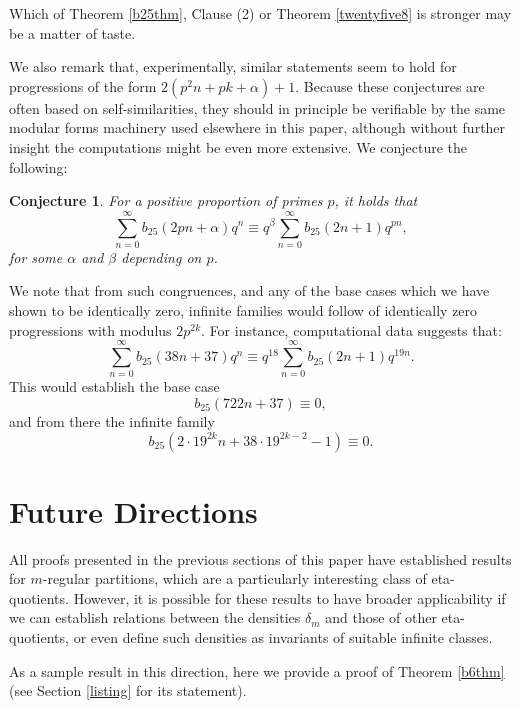 \documentclass[12pt]{amsart}
\newtheorem{conjecture}[theorem]{Conjecture}
\theoremstyle{definition}
\begin{document}
Which of Theorem \ref{b25thm}, Clause (2) or Theorem \ref{twentyfive8} is stronger may be a matter of taste.

We also remark that, experimentally, similar statements seem to hold for progressions of the form $2(p^2 n + pk + \alpha) +1$.  Because these conjectures are often based on self-similarities, they should in principle be verifiable by the same modular forms machinery used elsewhere in this paper, although without further insight the computations might be even more extensive.  We conjecture the following:
\begin{conjecture} For a positive proportion of primes $p$, it holds that $$\sum_{n=0}^\infty b_{25} (2pn+\alpha) q^n \equiv q^{\beta} \sum_{n=0}^\infty b_{25}(2n+1) q^{pn},$$ \noindent for some $\alpha$ and $\beta$ depending on $p$.
\end{conjecture}

We note that from such congruences, and any of the base cases which we have shown to be identically zero, infinite families would follow of identically zero progressions with modulus $2p^{2k}$.  For instance, computational data suggests that:
$$\sum_{n=0}^\infty b_{25}(38n+37) q^n \equiv q^{18} \sum_{n=0}^\infty b_{25} (2n+1) q^{19n}.$$
This would establish the base case
$$b_{25}(722n+37) \equiv 0,$$
and from there the infinite family $$b_{25}(2 \cdot 19^{2k} n + 38 \cdot 19^{2k-2} -1) \equiv 0.$$


\section{Future Directions}

All proofs presented in the previous sections of this paper have established results for $m$-regular partitions, which are a particularly interesting class of eta-quotients.  However, it is possible for these results to have broader applicability if we can establish relations between the densities $\delta_m$ and those of other eta-quotients, or even define such densities as invariants of suitable infinite classes. 

As a sample result in this direction, here we provide a proof of Theorem \ref{b6thm} (see Section \ref{listing} for its statement).
\end{document}
